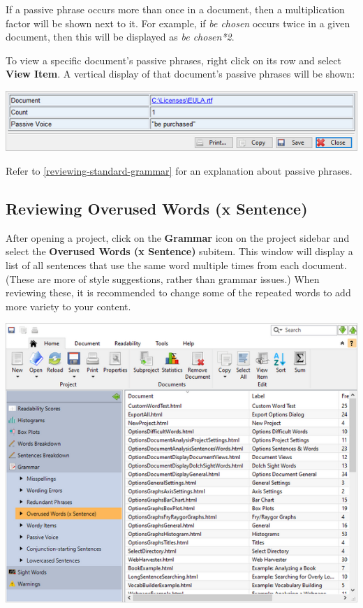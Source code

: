 \documentclass[
]{book}
\theoremstyle{definition}
\theoremstyle{definition}
\theoremstyle{definition}
\theoremstyle{definition}
\theoremstyle{remark}
\begin{document}
If a passive phrase occurs more than once in a document, then a multiplication factor will be shown next to it. For example, if \emph{be chosen} occurs twice in a given document, then this will be displayed as \emph{be chosen*2}.

To view a specific document's passive phrases, right click on its row and select \textbf{View Item}. A vertical display of that document's passive phrases will be shown:

\begin{center}\includegraphics[width=0.75\linewidth,]{Images/batchpassivevoiceviewitem} \end{center}

Refer to \ref{reviewing-standard-grammar} for an explanation about passive phrases.

\hypertarget{reviewing-batch-overused-words}{%
\subsection*{Reviewing Overused Words (x Sentence)}\label{reviewing-batch-overused-words}}

After opening a project, click on the \textbf{Grammar} icon on the project sidebar and select the \textbf{Overused Words (x Sentence)} subitem. This window will display a list of all sentences that use the same word multiple times from each document. (These are more of style suggestions, rather than grammar issues.) When reviewing these, it is recommended to change some of the repeated words to add more variety to your content.

\includegraphics{Images/batchoverusedwordsbysentence.png}
\end{document}
